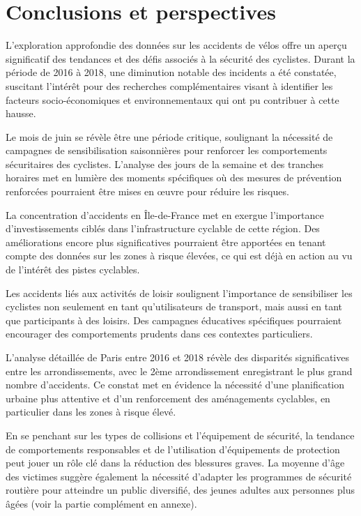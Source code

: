 \documentclass[french,]{compterendu}
\theoremstyle{urcastyle}
\theoremstyle{remark}
\begin{document}
\newpage

\hypertarget{conclusions-et-perspectives}{%
\section{Conclusions et perspectives}\label{conclusions-et-perspectives}}

L'exploration approfondie des données sur les accidents de vélos offre un aperçu significatif des tendances et des défis associés à la sécurité des cyclistes. Durant la période de 2016 à 2018, une diminution notable des incidents a été constatée, suscitant l'intérêt pour des recherches complémentaires visant à identifier les facteurs socio-économiques et environnementaux qui ont pu contribuer à cette hausse.

Le mois de juin se révèle être une période critique, soulignant la nécessité de campagnes de sensibilisation saisonnières pour renforcer les comportements sécuritaires des cyclistes. L'analyse des jours de la semaine et des tranches horaires met en lumière des moments spécifiques où des mesures de prévention renforcées pourraient être mises en œuvre pour réduire les risques.

La concentration d'accidents en Île-de-France met en exergue l'importance d'investissements ciblés dans l'infrastructure cyclable de cette région. Des améliorations encore plus significatives pourraient être apportées en tenant compte des données sur les zones à risque élevées, ce qui est déjà en action au vu de l'intérêt des pistes cyclables.

Les accidents liés aux activités de loisir soulignent l'importance de sensibiliser les cyclistes non seulement en tant qu'utilisateurs de transport, mais aussi en tant que participants à des loisirs. Des campagnes éducatives spécifiques pourraient encourager des comportements prudents dans ces contextes particuliers.

L'analyse détaillée de Paris entre 2016 et 2018 révèle des disparités significatives entre les arrondissements, avec le 2ème arrondissement enregistrant le plus grand nombre d'accidents. Ce constat met en évidence la nécessité d'une planification urbaine plus attentive et d'un renforcement des aménagements cyclables, en particulier dans les zones à risque élevé.

En se penchant sur les types de collisions et l'équipement de sécurité, la tendance de comportements responsables et de l'utilisation d'équipements de protection peut jouer un rôle clé dans la réduction des blessures graves. La moyenne d'âge des victimes suggère également la nécessité d'adapter les programmes de sécurité routière pour atteindre un public diversifié, des jeunes adultes aux personnes plus âgées (voir la partie complément en annexe).
\end{document}
